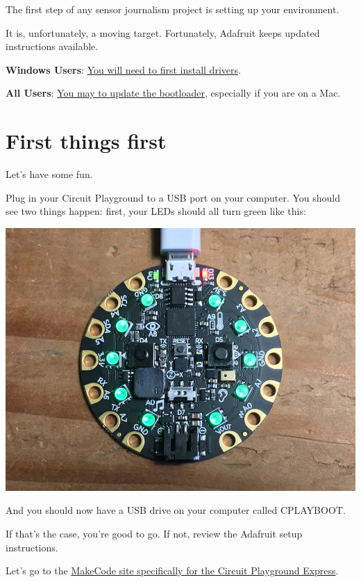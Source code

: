 \documentclass[
]{book}
\begin{document}
The first step of any sensor journalism project is setting up your environment.

It is, unfortunately, a moving target. Fortunately, Adafruit keeps updated instructions available.

\textbf{Windows Users}: \href{https://learn.adafruit.com/adafruit-circuit-playground-express/adafruit2-windows-driver-installation}{You will need to first install drivers}.

\textbf{All Users}: \href{https://learn.adafruit.com/adafruit-circuit-playground-express/updating-the-bootloader}{You may to update the bootloader}, especially if you are on a Mac.

\hypertarget{first-things-first}{%
\section{First things first}\label{first-things-first}}

Let's have some fun.

Plug in your Circuit Playground to a USB port on your computer. You should see two things happen: first, your LEDs should all turn green like this:

\includegraphics[width=1\linewidth]{images/01image1}

And you should now have a USB drive on your computer called CPLAYBOOT.

If that's the case, you're good to go. If not, review the Adafruit setup instructions.

Let's go to the \href{https://makecode.adafruit.com/}{MakeCode site specifically for the Circuit Playground Express}.
\end{document}
